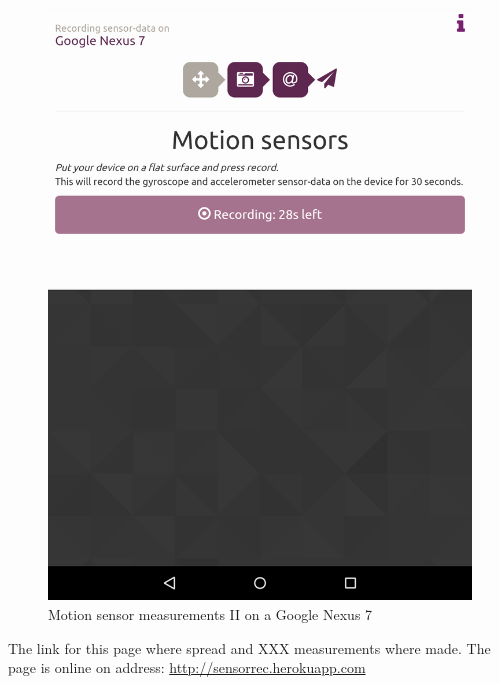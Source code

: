 \begin{figure}[H]
\begin{minipage}[c]{.23\textwidth}
    \includegraphics[scale=0.15]{img/sensorrec-nexus-1-rec}
  \end{minipage}
  \caption{Motion sensor measurements II on a Google Nexus 7}
  \label{fig:sensorrec}
\end{figure}
The link for this page where spread and XXX measurements where made. The page is online on address: \url{http://sensorrec.herokuapp.com}

